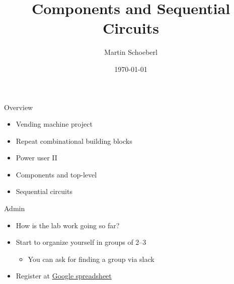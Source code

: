 

\newif\ifbook



\title{Components and Sequential Circuits}
\author{Martin Schoeberl}
\date{\today}



\begin{frame}
\titlepage
\end{frame}

\begin{frame}[fragile]{Overview}
\begin{itemize}
\item Vending machine project
\item Repeat combinational building blocks
\item Power user II
\item Components and top-level
\item Sequential circuits
\end{itemize}
\end{frame}


\begin{frame}[fragile]{Admin}
\begin{itemize}
\item How is the lab work going so far?
\item Start to organize yourself in groups of 2--3
\begin{itemize}
\item You can ask for finding a group via slack
\end{itemize}
\item Register at \href{https://docs.google.com/spreadsheets/d/1Hp81EyFYYvjm336DrwtCym9oRQUEzRKe6VceFp0ZCAQ/edit?usp=sharing}{Google spreadsheet}
\end{itemize}
\end{frame}


